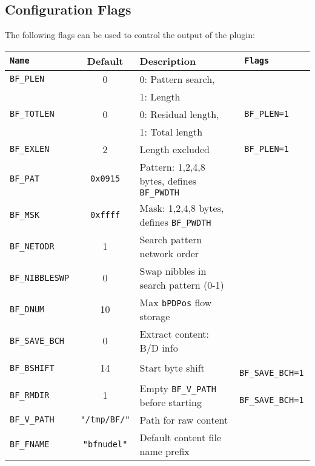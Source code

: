 \documentclass[documentation]{subfiles}
\begin{document}
\subsection{Configuration Flags}
The following flags can be used to control the output of the plugin:
\begin{longtable}{>{\tt}lcl>{\tt\small}l}
    \toprule
    {\bf Name} & {\bf Default} & {\bf Description} & {\bf Flags}\\
    \midrule\endhead%
    BF\_PLEN      &  0            & 0: Pattern search,                                    & \\
                  &               & 1: Length                                             & \\
    BF\_TOTLEN    &  0            & 0: Residual length,                                   & BF\_PLEN=1\\
                  &               & 1: Total length                                       & \\
    BF\_EXLEN     &  2            & Length excluded                                       & BF\_PLEN=1\\
    BF\_PAT       &  {\tt 0x0915} & Pattern: 1,2,4,8 bytes, defines {\tt\small BF\_PWDTH} & \\
    BF\_MSK       &  {\tt 0xffff} & Mask: 1,2,4,8 bytes, defines {\tt\small BF\_PWDTH}    & \\
    BF\_NETODR    &  1            & Search pattern network order                          & \\
    BF\_NIBBLESWP &  0            & Swap nibbles in search pattern (0-1)                  & \\
    BF\_DNUM      & 10            & Max {\tt bPDPos} flow storage                         & \\
    BF\_SAVE\_BCH &  0            & Extract content: B/D info                             & \\
    BF\_BSHIFT    & 14            & Start byte shift                                      & BF\_SAVE\_BCH=1\\
    BF\_RMDIR     &  1            & Empty {\tt\small BF\_V\_PATH} before starting         & BF\_SAVE\_BCH=1\\

    BF\_V\_PATH   & {\tt\small "/tmp/BF/"} & Path for raw content             & \\
    BF\_FNAME     & {\tt\small "bfnudel"}  & Default content file name prefix & \\
    \bottomrule
\end{longtable}
\end{document}
